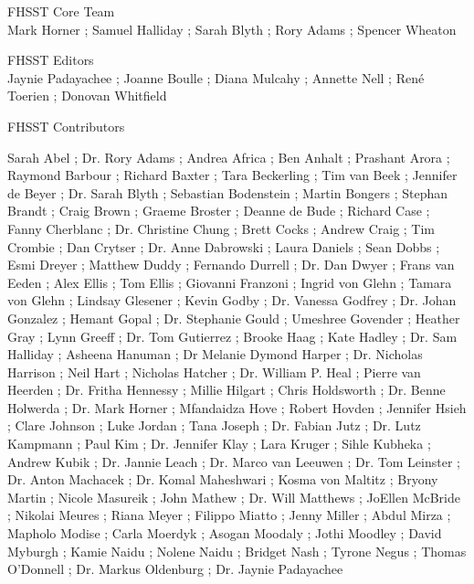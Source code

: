 \cleardoublepage
\begin{center}{\Large FHSST Core Team\\}
Mark Horner
; Samuel Halliday 
; Sarah Blyth 
; Rory Adams
; Spencer Wheaton
\end{center}

\begin{center}{\Large FHSST Editors\\}
Jaynie Padayachee 
; Joanne Boulle
; Diana Mulcahy
; Annette Nell
; Ren\'{e} Toerien
; Donovan Whitfield
\end{center}

\begin{center}{\Large FHSST Contributors\\}

Sarah Abel
; Dr. Rory Adams
; Andrea Africa
; Ben Anhalt
; Prashant Arora
; Raymond Barbour
; Richard Baxter
; Tara Beckerling
; Tim van Beek
; Jennifer de Beyer
; Dr. Sarah Blyth
; Sebastian Bodenstein
; Martin Bongers
; Stephan Brandt
; Craig Brown
; Graeme  Broster
; Deanne de Bude
; Richard Case
; Fanny Cherblanc
; Dr. Christine Chung
; Brett Cocks
; Andrew Craig
; Tim Crombie
; Dan Crytser
; Dr. Anne  Dabrowski
; Laura Daniels
; Sean Dobbs
; Esmi Dreyer
; Matthew Duddy
; Fernando Durrell
; Dr.  Dan Dwyer
; Frans van Eeden
; Alex Ellis 
; Tom Ellis 
; Giovanni Franzoni
; Ingrid von Glehn
; Tamara von Glehn
; Lindsay Glesener
; Kevin Godby 
; Dr. Vanessa Godfrey
; Dr. Johan Gonzalez
; Hemant Gopal
; Dr. Stephanie Gould
; Umeshree Govender
; Heather Gray
; Lynn Greeff
; Dr. Tom Gutierrez
; Brooke Haag
; Kate Hadley
; Dr. Sam Halliday
; Asheena Hanuman
; Dr Melanie Dymond Harper
; Dr. Nicholas Harrison
; Neil Hart
; Nicholas Hatcher
; Dr. William P. Heal
; Pierre van Heerden
; Dr. Fritha Hennessy
; Millie Hilgart
; Chris Holdsworth
; Dr. Benne Holwerda
; Dr. Mark Horner
; Mfandaidza Hove
; Robert Hovden
; Jennifer Hsieh
; Clare Johnson
; Luke Jordan
; Tana Joseph
; Dr. Fabian Jutz
; Dr. Lutz Kampmann
; Paul Kim
; Dr. Jennifer Klay
; Lara Kruger
; Sihle Kubheka
; Andrew  Kubik
; Dr. Jannie Leach
; Dr. Marco van Leeuwen
; Dr. Tom Leinster
; Dr. Anton Machacek
; Dr. Komal Maheshwari
; Kosma von  Maltitz
; Bryony Martin
; Nicole Masureik
; John Mathew
; Dr. Will Matthews
; JoEllen McBride
; Nikolai  Meures
; Riana Meyer
; Filippo Miatto
; Jenny Miller
; Abdul Mirza
; Mapholo Modise
; Carla Moerdyk
; Asogan Moodaly
; Jothi Moodley
; David Myburgh
; Kamie Naidu
; Nolene Naidu
; Bridget Nash
; Tyrone Negus
; Thomas O'Donnell
; Dr. Markus Oldenburg
; Dr. Jaynie Padayachee

\end{center}
